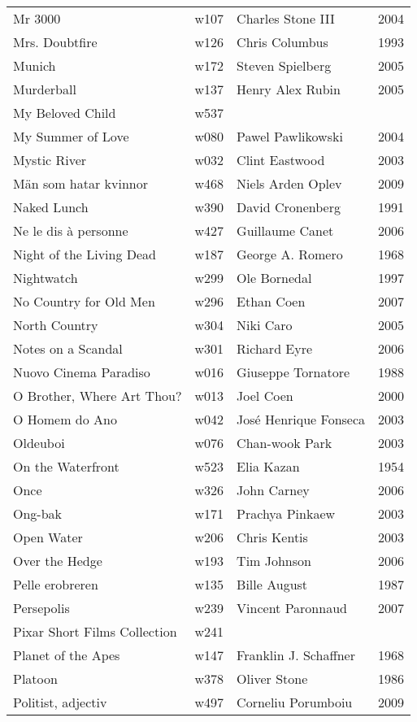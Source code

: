 \documentclass{article}
\begin{document}
\begin {center}
\begin{longtable}{p{10cm} l l l}
Mr 3000 & w107 & Charles Stone III & 2004 \\
Mrs. Doubtfire & w126 & Chris Columbus & 1993 \\
Munich & w172 & Steven Spielberg & 2005 \\
Murderball & w137 & Henry Alex Rubin & 2005 \\
My Beloved Child & w537 &  &  \\
My Summer of Love & w080 & Pawel Pawlikowski & 2004 \\
Mystic River & w032 & Clint Eastwood & 2003 \\
Män som hatar kvinnor & w468 & Niels Arden Oplev & 2009 \\
Naked Lunch & w390 & David Cronenberg & 1991 \\
Ne le dis à personne & w427 & Guillaume Canet & 2006 \\
Night of the Living Dead & w187 & George A. Romero & 1968 \\
Nightwatch & w299 & Ole Bornedal & 1997 \\
No Country for Old Men & w296 & Ethan Coen & 2007 \\
North Country & w304 & Niki Caro & 2005 \\
Notes on a Scandal & w301 & Richard Eyre & 2006 \\
Nuovo Cinema Paradiso & w016 & Giuseppe Tornatore & 1988 \\
O Brother, Where Art Thou? & w013 & Joel Coen & 2000 \\
O Homem do Ano & w042 & José Henrique Fonseca & 2003 \\
Oldeuboi & w076 & Chan-wook Park & 2003 \\
On the Waterfront & w523 & Elia Kazan & 1954 \\
Once & w326 & John Carney & 2006 \\
Ong-bak & w171 & Prachya Pinkaew & 2003 \\
Open Water & w206 & Chris Kentis & 2003 \\
Over the Hedge & w193 & Tim Johnson & 2006 \\
Pelle erobreren & w135 & Bille August & 1987 \\
Persepolis & w239 & Vincent Paronnaud & 2007 \\
Pixar Short Films Collection & w241 &  &  \\
Planet of the Apes & w147 & Franklin J. Schaffner & 1968 \\
Platoon & w378 & Oliver Stone & 1986 \\
Politist, adjectiv & w497 & Corneliu Porumboiu & 2009 \\

\end{longtable}
\end{center}
\end{document}
